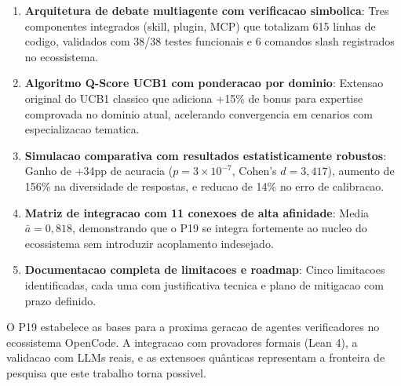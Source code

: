 \documentclass[5p]{elsarticle}
\begin{document}
\begin{enumerate}[label=(\arabic*)]
  \item \textbf{Arquitetura de debate multiagente com verificacao simbolica}: Tres componentes integrados (skill, plugin, MCP) que totalizam 615 linhas de codigo, validados com 38/38 testes funcionais e 6 comandos slash registrados no ecossistema.

  \item \textbf{Algoritmo Q-Score UCB1 com ponderacao por dominio}: Extensao original do UCB1 classico \cite{auer2002} que adiciona +15\% de bonus para expertise comprovada no dominio atual, acelerando convergencia em cenarios com especializacao tematica.

  \item \textbf{Simulacao comparativa com resultados estatisticamente robustos}: Ganho de +34pp de acuracia ($p = 3 \times 10^{-7}$, Cohen's $d = 3,417$), aumento de 156\% na diversidade de respostas, e reducao de 14\% no erro de calibracao.

  \item \textbf{Matriz de integracao com 11 conexoes de alta afinidade}: Media $\bar{a} = 0,818$, demonstrando que o P19 se integra fortemente ao nucleo do ecossistema sem introduzir acoplamento indesejado.

  \item \textbf{Documentacao completa de limitacoes e roadmap}: Cinco limitacoes identificadas, cada uma com justificativa tecnica e plano de mitigacao com prazo definido.
\end{enumerate}

O P19 estabelece as bases para a proxima geracao de agentes verificadores no ecossistema OpenCode. A integracao com provadores formais (Lean 4), a validacao com LLMs reais, e as extensoes qu\^anticas representam a fronteira de pesquisa que este trabalho torna possivel.



\end{document}
